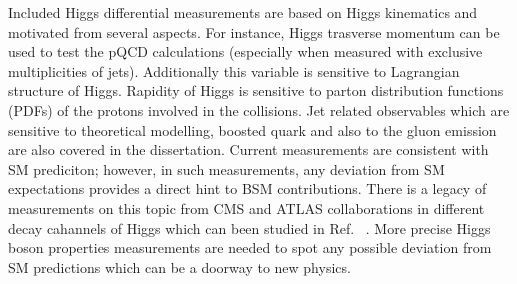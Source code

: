 Included Higgs differential measurements are based on Higgs kinematics and motivated from several aspects. For instance, Higgs trasverse momentum can be used to test the pQCD calculations (especially when measured with exclusive multiplicities of jets). Additionally this variable is sensitive to Lagrangian structure of Higgs. Rapidity of Higgs is sensitive to parton distribution functions (PDFs) of the protons involved in the collisions. Jet related observables which are sensitive to theoretical modelling, boosted quark and also to the gluon emission are also covered in the dissertation. Current measurements are consistent with SM prediciton; however, in such measurements, any deviation  from SM expectations provides a direct hint to BSM contributions. 
There is a legacy of measurements on this topic from CMS and ATLAS collaborations in different decay cahannels of Higgs which can been studied in Ref. ~\cite{Khachatryan:2015yvw, CMS:2015hja, CMS:2016rqf, Sirunyan:2017exp, CMS:2018hhg, ATLAS-CONF-2019-029, CMSHggFiducial8TeV, atlas-conf-2019-025, ATLAS:2018uso, ATLAS-CONF-2019-032, ATLAS:2017myr,  CMS:Hgg_8TeV, CMS:2019chr, Sirunyan:2020xwk}. %
More precise Higgs boson properties measurements are needed to spot any possible deviation
from SM predictions which can be a doorway to new physics.

